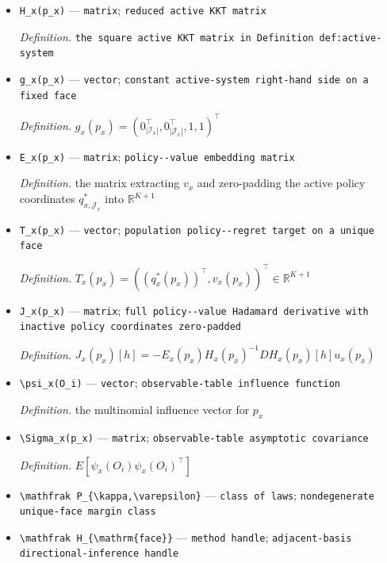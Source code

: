 \documentclass{article}
\begin{document}
\begin{itemize}
  \par\smallskip\noindent\emph{Definition.} \(u_x(p_x)=(q_{x,\mathcal J_x}^*(p_x),v_x(p_x),\lambda_{\mathcal I_x},\eta_x)\)
  \item \texttt{H\_\allowbreak{}x(p\_\allowbreak{}x)} --- \texttt{matrix}; \texttt{reduced active KKT matrix}
  \par\smallskip\noindent\emph{Definition.} \texttt{the square active KKT matrix in Definition def:\allowbreak{}active-\allowbreak{}system}
  \item \texttt{g\_\allowbreak{}x(p\_\allowbreak{}x)} --- \texttt{vector}; \texttt{constant active-\allowbreak{}system right-\allowbreak{}hand side on a fixed face}
  \par\smallskip\noindent\emph{Definition.} \(g_x(p_x)=(0_{|\mathcal I_x|}^\top,0_{|\mathcal J_x|}^\top,1,1)^\top\)
  \item \texttt{E\_\allowbreak{}x(p\_\allowbreak{}x)} --- \texttt{matrix}; \texttt{policy-\allowbreak{}-\allowbreak{}value embedding matrix}
  \par\smallskip\noindent\emph{Definition.} the matrix extracting \(v_x\) and zero-padding the active policy coordinates \(q_{x,\mathcal J_x}^*\) into \(\mathbb R^{K+1}\)
  \item \texttt{T\_\allowbreak{}x(p\_\allowbreak{}x)} --- \texttt{vector}; \texttt{population policy-\allowbreak{}-\allowbreak{}regret target on a unique face}
  \par\smallskip\noindent\emph{Definition.} \(T_x(p_x)=((q_x^*(p_x))^\top,v_x(p_x))^\top\in\mathbb R^{K+1}\)
  \item \texttt{J\_\allowbreak{}x(p\_\allowbreak{}x)} --- \texttt{matrix}; \texttt{full policy-\allowbreak{}-\allowbreak{}value Hadamard derivative with inactive policy coordinates zero-\allowbreak{}padded}
  \par\smallskip\noindent\emph{Definition.} \(J_x(p_x)[h]=-E_x(p_x)H_x(p_x)^{-1}DH_x(p_x)[h]u_x(p_x)\)
  \item \texttt{\textbackslash{}\allowbreak{}psi\_\allowbreak{}x(O\_\allowbreak{}i)} --- \texttt{vector}; \texttt{observable-\allowbreak{}table influence function}
  \par\smallskip\noindent\emph{Definition.} the multinomial influence vector for \(p_x\)
  \item \texttt{\textbackslash{}\allowbreak{}Sigma\_\allowbreak{}x(p\_\allowbreak{}x)} --- \texttt{matrix}; \texttt{observable-\allowbreak{}table asymptotic covariance}
  \par\smallskip\noindent\emph{Definition.} \(E[\psi_x(O_i)\psi_x(O_i)^\top]\)
  \item \texttt{\textbackslash{}\allowbreak{}mathfrak P\_\allowbreak{}\{\textbackslash{}\allowbreak{}kappa,\allowbreak{}\textbackslash{}\allowbreak{}varepsilon\}\allowbreak{}} --- \texttt{class of laws}; \texttt{nondegenerate unique-\allowbreak{}face margin class}
  \item \texttt{\textbackslash{}\allowbreak{}mathfrak H\_\allowbreak{}\{\textbackslash{}\allowbreak{}mathrm\{face\}\allowbreak{}\}\allowbreak{}} --- \texttt{method handle}; \texttt{adjacent-\allowbreak{}basis directional-\allowbreak{}inference handle}
\end{itemize}
\end{document}
